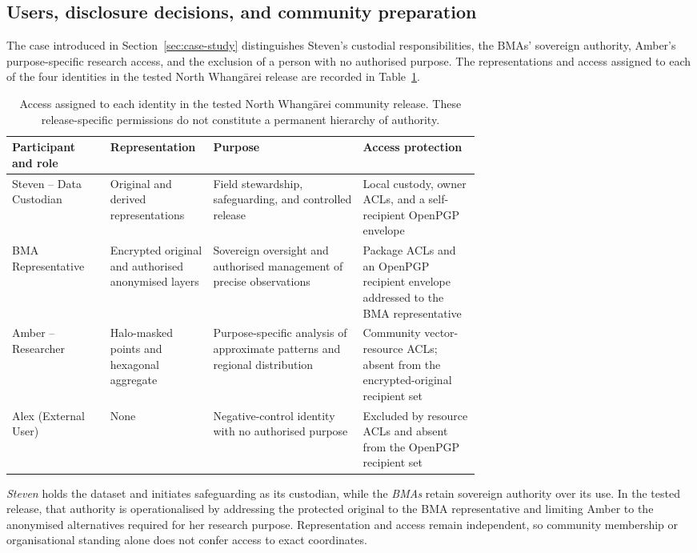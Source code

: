 \documentclass[]{interact}
\begin{document}
\subsection{Users, disclosure decisions, and community preparation}
\label{sec:users-community}

The case introduced in Section~\ref{sec:case-study} distinguishes Steven's custodial responsibilities, the BMAs' sovereign authority, Amber's purpose-specific research access, and the exclusion of a person with no authorised purpose. The representations and access  assigned to each of the four identities in the tested North Whangārei release are recorded in Table~\ref{tab:disclosure-decisions}.

\begin{table}[h!]
\centering
\caption{Access assigned to each identity in the tested North Whangārei community release. These release-specific permissions do not constitute a permanent hierarchy of authority.}
\label{tab:disclosure-decisions}
\small
\begin{tabularx}{\linewidth}{>{\raggedright\arraybackslash}p{0.21\linewidth}>{\raggedright\arraybackslash}p{0.22\linewidth}>{\raggedright\arraybackslash}X>{\raggedright\arraybackslash}p{0.25\linewidth}}
\toprule
\textbf{Participant and role} & \textbf{Representation} & \textbf{Purpose} & \textbf{Access protection} \\
\midrule
Steven -- Data Custodian & Original and derived representations & Field stewardship, safeguarding, and controlled release & Local custody, owner ACLs, and a self-recipient OpenPGP envelope \\
 BMA Representative & Encrypted original and authorised anonymised layers & Sovereign oversight and authorised management of precise observations & Package ACLs and an OpenPGP recipient envelope addressed to the BMA representative \\
 Amber -- Researcher & Halo-masked points and hexagonal aggregate & Purpose-specific analysis of approximate patterns and regional distribution & Community vector-resource ACLs; absent from the encrypted-original recipient set \\
Alex (External User) & None & Negative-control identity with no authorised purpose & Excluded by resource ACLs and absent from the OpenPGP recipient set \\
\bottomrule
\end{tabularx}
\end{table}

\textit{Steven} holds the dataset and initiates safeguarding as its custodian, while the \textit{BMAs} retain sovereign authority over its use. In the tested release, that authority is operationalised by addressing the protected original to the BMA representative and limiting Amber to the anonymised alternatives required for her research purpose. Representation and access remain independent, so community membership or organisational standing alone does not confer access to exact coordinates.
\end{document}
